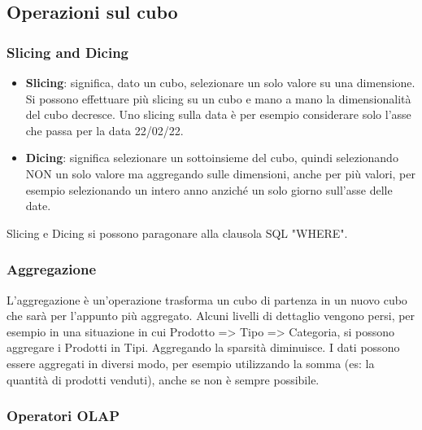 \subsection{Operazioni sul cubo}
\subsubsection{Slicing and Dicing}
\begin{itemize}
	\item \textbf{Slicing}: significa, dato un cubo, selezionare un solo valore su una dimensione. Si possono effettuare più slicing su un cubo e mano a mano la dimensionalità del cubo decresce. Uno slicing sulla data è per esempio considerare solo l'asse che passa per la data 22/02/22.
	\item \textbf{Dicing}: significa selezionare un sottoinsieme del cubo, quindi selezionando NON un solo valore ma aggregando sulle dimensioni, anche per più valori, per esempio selezionando un intero anno anziché un solo giorno sull'asse delle date.
\end{itemize}
\noindent Slicing e Dicing si possono paragonare alla clausola SQL "WHERE".
\subsubsection{Aggregazione}
L'aggregazione è un'operazione trasforma un cubo di partenza in un nuovo cubo che sarà per l'appunto più aggregato. Alcuni livelli di dettaglio vengono persi, per esempio in una situazione in cui Prodotto => Tipo => Categoria, si possono aggregare i Prodotti in Tipi.\newline
Aggregando la sparsità diminuisce.
I dati possono essere aggregati in diversi modo, per esempio utilizzando la somma (es: la quantità di prodotti venduti), anche se non è sempre possibile.
\subsubsection{Operatori OLAP}

